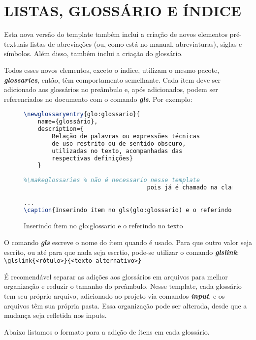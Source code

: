 \chapter{LISTAS, GLOSSÁRIO E ÍNDICE}

Esta nova versão do template também inclui a criação de novos elementos pré-textuais listas de abreviações (ou, como está no manual, abreviaturas), siglas e símbolos. Além disso, também inclui a criação do glossário.

Todos esses novos elementos, exceto o índice, utilizam o mesmo pacote, \textit{\textbf{glossaries}}, então, têm comportamento semelhante. Cada ítem deve ser adicionado aos glossários no preâmbulo e, após adicionados, podem ser referenciados no documento com o comando \textit{\textbf{gls}}. Por exemplo:
	
\begin{figure}[!htb]
	\centering
	\caption{Inserindo ítem no \gls{glo:glossario} e o referindo no texto} %
	\begin{lstlisting}[language=tex]
\newglossaryentry{glo:glossario}{
	name={glossário}, 
	description={
		Relação de palavras ou expressões técnicas 
		de uso restrito ou de sentido obscuro, 
		utilizadas no texto, acompanhadas das 
		respectivas definições}
	}
		
%\makeglossaries % não é necessario nesse template
		                           pois já é chamado na classe

...
\caption{Inserindo ítem no gls(glo:glossario) e o referindo no texto}
	\end{lstlisting}
	\label{fig:exemploglossario1} %
\end{figure}

O comando \textit{\textbf{gls}} escreve o nome do ítem quando é usado. Para que outro valor seja escrito, ou até para que nada seja escrtio, pode-se utilizar o comando \textit{\textbf{glslink}}:\\
\verb|\glslink{<rótulo>}{<texto alternativo>}|

É recomendável separar as adições aos glossários em arquivos para melhor organização e reduzir o tamanho do preâmbulo. Nesse template, cada glossário tem seu próprio arquivo, adicionado ao projeto via comandos \textit{\textbf{input}}, e os arquivos têm sua própria pasta. Essa organização pode ser alterada, desde que a mudança seja refletida nos inputs.

\newpage
Abaixo listamos o formato para a adição de ítens em cada glossário. 

